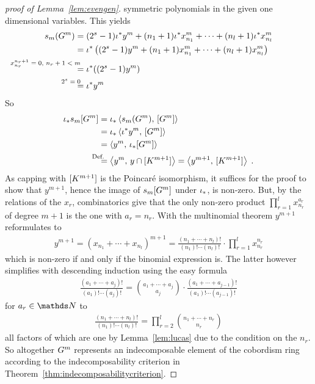 \begin{proof}[proof of
  Lemma~\ref{lem:evengen}]
  symmetric polynomials in the given one dimensional variables.
  This yields
  \begin{align*}
    \s{m}(\G m)
    &= (2^s-1) \pb\emb y^m
      + (n_1+1) \pb\emb x_{n_1}^m
      + \dotsb
      + (n_l+1)\pb\emb x_{n_l}^m
    \\
    &= \pb\emb\left(
      (2^s-1)y^m
      + (n_1+1)x_{n_1}^m
      + \dotsb
      + (n_l+1)x_{n_l}^m
      \right) \\
    &\equalsby{$x_{n_r}^{n_r+1}=0$, $n_r+1<m$}
      \pb\emb((2^s-1)y^m) \\
    &\equalsby{$2^s=0$}
      \pb\emb y^m
  \end{align*}
  So
  \begin{align*}
    \pf\emb\snum{m}{\G m}
    &= \pf\emb\capped{\s{m}(\G m)}{\fundcl{\G m}} \\
    &= \pf\emb\capped{\pb\emb y^m}{\fundcl{\G m}} \\
    &= \capped{y^m}{\pf\emb\fundcl{\G m}} \\
    &\equalsby{Def.} \capped{y^m}{y\cap\fundcl{K^{m+1}}}
      = \capped{y^{m+1}}{\fundcl{K^{m+1}}}
      \;.
  \end{align*}
  As capping with $[K^{m+1}]$ is the Poincaré isomorphism, it
  suffices for the proof to show that $y^{m+1}$, hence the image of
  $s_{m}[G^{m}]$ under ${{\iota}}_*$, is non-zero. But, by the relations
  of the $x_r$, combinatorics give that the only non-zero product
  $\prod_{r=1}^{l}x_{n_r}^{a_r}$ of degree $m+1$ is the one with
  $a_r=n_r$.
  With the multinomial theorem $y^{m+1}$ reformulates to
  \begin{gather*}
    y^{m+1}
    = (x_{n_1}+\dotsb+x_{n_l})^{m+1}
    = \frac{(n_1 + \dotsb + n_l)!} {(n_1)! \dotsm (n_l)!}
    \cdot \prod_{r=1}^{l}x_{n_r}^{n_r}
  \end{gather*}
  which is non-zero if and only if the binomial expression is.
  The latter however simplifies with descending induction using the
  easy formula
  \begin{gather*}
    \frac{(a_1+\dotsb+a_j)!}{(a_1)!\dotsm(a_j)!}
    = \binom{a_1+\dotsb+a_j}{a_j}
    \cdot \frac{(a_1+\dotsb+a_{j-1})!}{(a_1)!\dotsm(a_{j-1})!}
  \end{gather*}
  for $a_r\in\Nat$ to
  \begin{gather*}
    \frac{(n_1+\dotsb+n_l)!}{(n_1)! \dotsm (n_l)!}
    = \prod_{r=2}^{l}\binom{n_1+\dotsb+n_r}{n_r}
  \end{gather*}
  all factors of which are one by Lemma~\ref{lem:lucas} due to the
  condition on the $n_r$.
  So altogether $G^{m}$ represents an indecomposable element of
  the cobordism ring according to the indecomposability criterion
  in Theorem~\ref{thm:indecomposabilitycriterion}.
  \qedhere
\end{proof}

